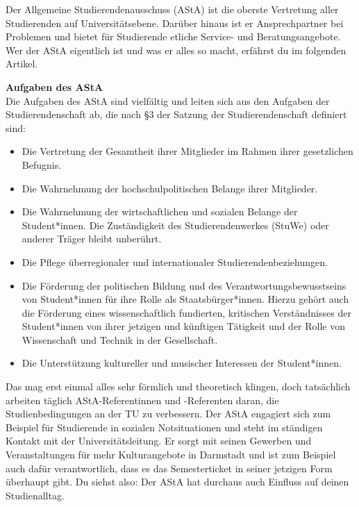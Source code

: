 {Der Allgemeine Studierendenausschuss (AStA) ist die oberste Vertretung aller Studierenden auf Universitätsebene. Darüber hinaus ist er Ansprechpartner bei Problemen und bietet für Studierende etliche Service- und Beratungsangebote.
Wer der AStA eigentlich ist und was er alles so macht, erfährst du im folgenden Artikel.
}{
\noindent\textbf{Aufgaben des AStA}\\
Die Aufgaben des AStA sind vielfältig und leiten sich aus den Aufgaben der Studierendenschaft ab, die nach §3 der Satzung der Studierendenschaft definiert sind:

\begin{itemize}
\item	Die Vertretung der Gesamtheit ihrer Mitglieder im Rahmen ihrer gesetzlichen Befugnis.
\item	Die Wahrnehmung der hochschulpolitischen Belange ihrer Mitglieder.
\item	Die Wahrnehmung der wirtschaftlichen und sozialen Belange der Student*innen. Die Zuständigkeit des Studierendenwerkes (StuWe) oder anderer Träger bleibt unberührt.
\item	Die Pflege überregionaler und internationaler Studierendenbeziehungen.
\item	Die Förderung der politischen Bildung und des Verantwortungsbewusstseins von Student*innen für ihre Rolle als Staatsbürger*innen. Hierzu gehört auch die Förderung eines wissenschaftlich fundierten, kritischen Verständnisses der Student*innen von ihrer jetzigen und künftigen Tätigkeit und der Rolle von Wissenschaft und Technik in der Gesellschaft.
\item	Die Unterstützung kultureller und musischer Interessen der Student*innen.
\end{itemize}

Das mag erst einmal alles sehr förmlich und theoretisch klingen, doch tatsächlich arbeiten täglich AStA-Referentinnen und -Referenten daran, die Studienbedingungen an der TU zu verbessern. Der AStA engagiert sich zum Beispiel für Studierende in sozialen Notsituationen und steht im ständigen Kontakt mit der Universitätsleitung. Er sorgt mit seinen Gewerben und Veranstaltungen für mehr Kulturangebote in Darmstadt und ist zum Beispiel auch dafür verantwortlich, dass es das Semesterticket in seiner jetzigen Form überhaupt gibt.
Du siehst also: Der AStA hat durchaus auch Einfluss auf deinen Studienalltag.\\



}
